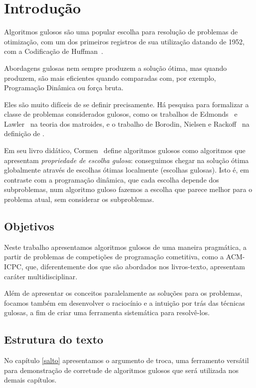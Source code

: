 \chapter{Introdução}
\label{intro}

Algoritmos gulosos são uma popular escolha para resolução de problemas de otimização, com um dos primeiros registros de sua utilização datando de 1952, com a Codificação de Huffman~\cite{huffman1952method}.

Abordagens gulosas nem sempre produzem a solução ótima, mas quando produzem, são mais eficientes quando comparadas com, por exemplo, Programação Dinâmica ou força bruta.

Eles são muito difíceis de se definir precisamente. Há pesquisa para formalizar a classe de problemas considerados gulosos, como os trabalhos de Edmonds~\cite{Edmonds1971} e Lawler~\cite{lawler2001combinatorial} na teoria dos matroides, e o trabalho de Borodin, Nielsen e Rackoff~\cite{Borodin2003} na definição de .

Em seu livro didático, Cormen~\cite{CLRS} define algoritmos gulosos como algoritmos que apresentam \emph{propriedade de escolha gulosa}: conseguimos chegar na solução ótima globalmente através de escolhas ótimas localmente (escolhas gulosas). Isto é, em contraste com a programação dinâmica, que cada escolha depende dos subproblemas, num algoritmo guloso fazemos a escolha que parece melhor para o problema atual, sem considerar os subproblemas.

\section{Objetivos}

Neste trabalho apresentamos algoritmos gulosos de uma maneira pragmática, a partir de problemas de competições de programação cometitiva, como a ACM-ICPC, que, diferentemente dos que são abordados nos livros-texto, apresentam caráter multidisciplinar.

Além de apresentar os conceitos paralelamente as soluções para os problemas, focamos também em desenvolver o raciocínio e a intuição por trás das técnicas gulosas, a fim de criar uma ferramenta sistemática para resolvê-los.

\section{Estrutura do texto}

No capítulo \ref{salto} apresentamos o argumento de troca, uma ferramento versátil para demonstração de corretude de algoritmos gulosos que será utilizada nos demais capítulos.

